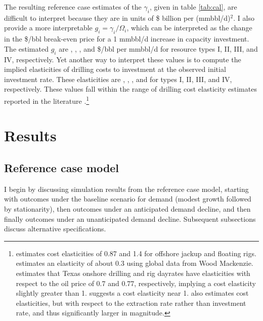 \documentclass[12pt]{article}
\begin{document}
The resulting reference case estimates of the $\gamma_i$, given in table \ref{tab:cal}, are difficult to interpret because they are in units of \$ billion per (mmbbl/d)$^2$. I also provide a more interpretable $g_i = \gamma_i/\Omega_i$, which can be interpreted as the change in the \$/bbl break-even price for a 1 mmbbl/d increase in capacity investment. The estimated $g_i$ are \unskip, \unskip, \unskip, and \$/bbl per mmbbl/d for resource types I, II, III, and IV, respectively. Yet another way to interpret these values is to compute the implied elasticities of drilling costs to investment at the observed initial investment rate. These elasticities are \unskip, \unskip, \unskip, and for types I, II, III, and IV, respectively. These values fall within the range of drilling cost elasticity estimates reported in the literature \citep{kaisersnyder2012,toewsnaumov2015,aks2018,Vreugdenhil2024}.\footnote{\cite{kaisersnyder2012} estimates cost elasticities of 0.87 and 1.4 for offshore jackup and floating rigs. \cite{toewsnaumov2015} estimates an elasticity of about 0.3 using global data from Wood Mackenzie. \cite{aks2018} estimates that Texas onshore drilling and rig dayrates have elasticities with respect to the oil price of 0.7 and 0.77, respectively, implying a cost elasticity slightly greater than 1. \cite{Vreugdenhil2024} suggests a cost elasticity near 1. \cite{BornsteinEtAl2023} also estimates cost elasticities, but with respect to the extraction rate rather than investment rate, and thus significantly larger in magnitude.}



\section{Results} \label{sec:results}

\subsection{Reference case model} \label{sec:results_ref}

I begin by discussing simulation results from the reference case model, starting with outcomes under the baseline scenario for demand (modest growth followed by stationarity), then outcomes under an anticipated demand decline, and then finally outcomes under an unanticipated demand decline. Subsequent subsections discuss alternative specifications.
\end{document}
